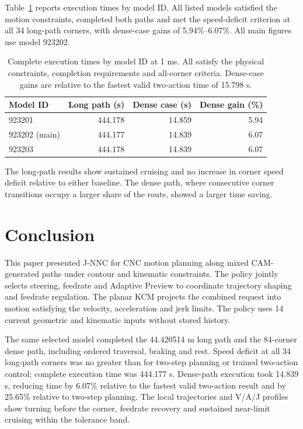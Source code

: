 \documentclass[preprint,12pt,nonatbib]{elsarticle}
\begin{document}
Table~\ref{tab:selected_models} reports execution times by model ID. All listed models satisfied the motion constraints, completed both paths and met the speed-deficit criterion at all 34 long-path corners, with dense-case gains of 5.94\%--6.07\%. All main figures use model 923202.

\begin{table}[htbp]
\centering
\caption{Complete execution times by model ID at 1 ms. All satisfy the physical constraints, completion requirements and all-corner criteria. Dense-case gains are relative to the fastest valid two-action time of 15.798 s.}
\label{tab:selected_models}
\small
\begin{tabular}{lrrr}
\toprule
Model ID & Long path (s) & Dense case (s) & Dense gain (\%)\\
\midrule
923201 & 444.178 & 14.859 & 5.94\\
923202 (main) & 444.177 & 14.839 & 6.07\\
923203 & 444.178 & 14.839 & 6.07\\
\bottomrule
\end{tabular}
\end{table}

The long-path results show sustained cruising and no increase in corner speed deficit relative to either baseline. The dense path, where consecutive corner transitions occupy a larger share of the route, showed a larger time saving.

\section{Conclusion}
\label{sec:conclusion}
This paper presented J-NNC for CNC motion planning along mixed CAM-generated paths under contour and kinematic constraints. The policy jointly selects steering, feedrate and Adaptive Preview to coordinate trajectory shaping and feedrate regulation. The planar KCM projects the combined request into motion satisfying the velocity, acceleration and jerk limits. The policy uses 14 current geometric and kinematic inputs without stored history.

The same selected model completed the 44.420514 m long path and the 84-corner dense path, including ordered traversal, braking and rest. Speed deficit at all 34 long-path corners was no greater than for two-step planning or trained two-action control; complete execution time was 444.177 s. Dense-path execution took 14.839 s, reducing time by 6.07\% relative to the fastest valid two-action result and by 25.65\% relative to two-step planning. The local trajectories and V/A/J profiles show turning before the corner, feedrate recovery and sustained near-limit cruising within the tolerance band.
\end{document}
